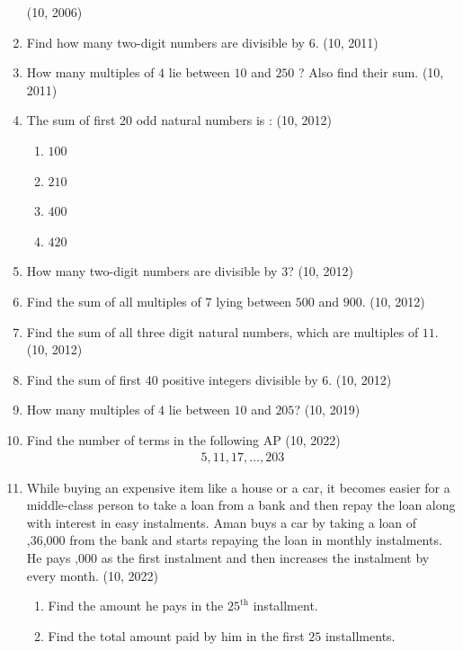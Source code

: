 \begin{enumerate}[label=\thesubsection.\arabic*,ref=\thesubsection.\theenumi,itemsep=1pt]
    \hfill (10, 2006)
\item Find how many two-digit numbers are divisible by $6$.
    \hfill (10, 2011)
\item  How many multiples of $4$ lie between $10$ and $250$ ? Also find their sum.
    \hfill (10, 2011)
\item The sum of first 20 odd natural numbers is : 
    \hfill (10, 2012)
    \begin{multicols}{4}
\begin{enumerate}
\item $100$ 
\item $210$ 
\item $400$ 
\item $420$ 
\end{enumerate}
\end{multicols}
\item How many two-digit numbers are divisible by 3? 
    \hfill (10, 2012)
\item Find the sum of all multiples of 7 lying between $500$ and $900$. 
    \hfill (10, 2012)
\item Find the sum of all three digit natural numbers, which are multiples of $11$. 
    \hfill (10, 2012)
\item Find the sum of first 40 positive integers divisible by $6$. 
    \hfill (10, 2012)
\item How many multiples of $4$ lie between $10$ and $205$?   
    \hfill (10, 2019)
\item Find the number of terms in the following AP
 \hfill (10, 2022) 
            \begin{align*}
                5,11,17,\dots,203
            \end{align*}
	\item While buying an expensive item like a house or a car, it becomes easier for a middle-class person to take a loan from a bank and then repay the loan along with interest in easy instalments. 
          Aman buys a car by taking a loan of ,36,000 from the bank and starts repaying the loan in monthly instalments. He pays ,000 as the first instalment and then increases the instalment by  every month. 
\hfill (10, 2022)
        \begin{enumerate}
         \item Find the amount he pays in the $25^{\text{th}}$ installment.
 \item Find the total amount paid by him in the first $25$ installments.
        \end{enumerate}

\end{enumerate}
